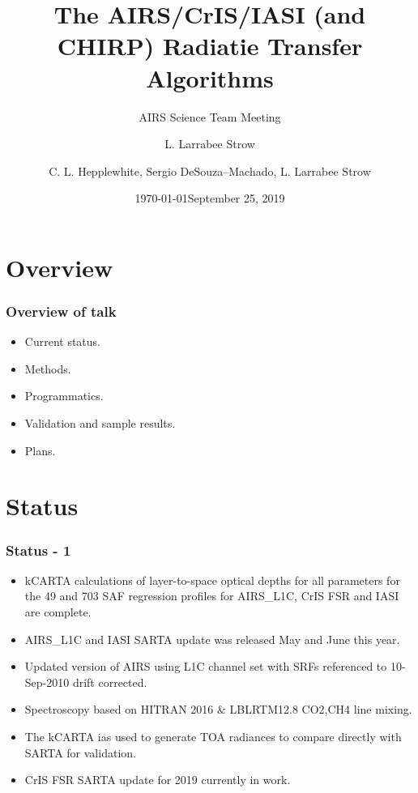\documentclass[10pt,t]{beamer}
\author{L. Larrabee Strow}
\date{\today}
\title{\large The AIRS/CrIS/IASI (and CHIRP) \newline
 Radiatie Transfer Algorithms }
\subtitle{\footnotesize{AIRS Science Team Meeting}}
\date{\vspace{0.1in}\footnotesize{September 25, 2019 \vfill}}
\author{C. L. Hepplewhite\inst{1,2}, Sergio DeSouza--Machado\inst{1,2}, L. Larrabee Strow\inst{1,2}}
\institute[UMBC]{\inst{1} UMBC Physics Dept. \and \inst{2}UMBC JCET}
\begin{document}
\maketitle
{}

\section{Overview}
\begin{frame}
  \frametitle{Overview of talk}
  \begin{itemize}
  \item Current status.
  \item Methods.
  \item Programmatics.
  \item Validation and sample results.
  \item Plans.
    
  \end{itemize}
\end{frame}

\section{Status}
\begin{frame}
  \frametitle{Status - 1}
  \begin{itemize}
  \item kCARTA calculations of layer-to-space optical depths for all parameters for the 49 and 703 SAF regression profiles for AIRS\_L1C, CrIS FSR and IASI are complete. 
  \item AIRS\_L1C and IASI SARTA update was released May and June this year.
  \item Updated version of AIRS using L1C channel set with SRFs referenced to 10-Sep-2010 drift corrected. 
  \item Spectroscopy based on HITRAN 2016 \& LBLRTM12.8 CO2,CH4 line mixing.
  \item The kCARTA ias used to generate TOA radiances to compare directly with SARTA for validation.
  \item CrIS FSR SARTA update for 2019 currently in work.
  
  \end{itemize}
\end{frame}
\end{document}
